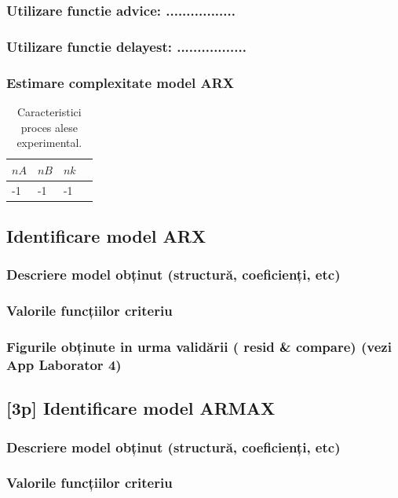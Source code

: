 \documentclass[12pt,english]{article}
\begin{document}
\subsubsection { Utilizare functie advice: ................. }
\subsubsection { Utilizare functie delayest: ................. }
\subsubsection { Estimare complexitate model ARX }
\begin{table}[H]
  \centering
    \begin{tabular}{|l|l|l|l|}
      \hline
      $nA$ & $nB$ & $nk$ \\
      \hline
      -1 & -1 & -1 \\
      \hline
    \end{tabular}
    \caption{Caracteristici proces alese experimental.}
\end{table}

\subsection { Identificare model ARX }
\subsubsection { Descriere model obținut (structură, coeficienți, etc) }
\subsubsection { Valorile funcțiilor criteriu }
\subsubsection { Figurile obținute in urma validării ( resid \& compare) (vezi App Laborator 4) }
\subsection { [3p] Identificare model ARMAX }
\subsubsection { Descriere model obținut (structură, coeficienți, etc) }
\subsubsection { Valorile funcțiilor criteriu }
\end{document}

